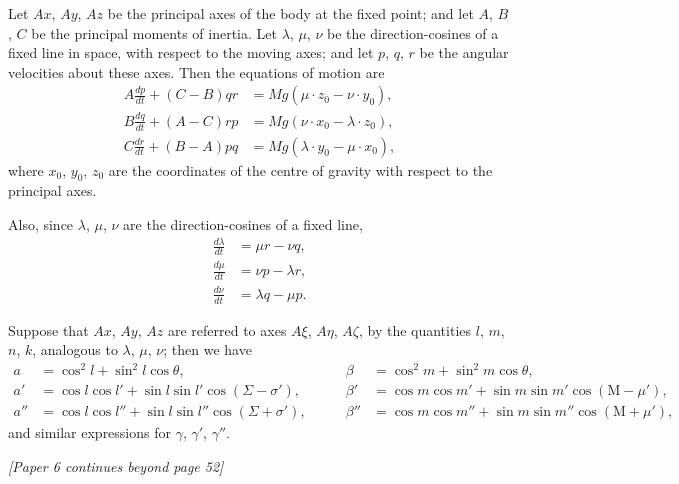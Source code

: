 \documentclass[11pt,a4paper]{book}
\begin{document}
Let $Ax$, $Ay$, $Az$ be the principal axes of the body at the fixed point; and let $A$, $B$, $C$ be the principal moments of inertia. Let $\lambda$, $\mu$, $\nu$ be the direction-cosines of a fixed line in space, with respect to the moving axes; and let $p$, $q$, $r$ be the angular velocities about these axes. Then the equations of motion are
\begin{align}
A \frac{dp}{dt} + (C - B)qr &= M g (\mu \cdot z_0 - \nu \cdot y_0), \\
B \frac{dq}{dt} + (A - C)rp &= M g (\nu \cdot x_0 - \lambda \cdot z_0), \\
C \frac{dr}{dt} + (B - A)pq &= M g (\lambda \cdot y_0 - \mu \cdot x_0),
\end{align}
where $x_0$, $y_0$, $z_0$ are the coordinates of the centre of gravity with respect to the principal axes.

Also, since $\lambda$, $\mu$, $\nu$ are the direction-cosines of a fixed line,
\begin{align}
\frac{d\lambda}{dt} &= \mu r - \nu q, \\
\frac{d\mu}{dt} &= \nu p - \lambda r, \\
\frac{d\nu}{dt} &= \lambda q - \mu p.
\end{align}

Suppose that $Ax$, $Ay$, $Az$ are referred to axes $A\xi$, $A\eta$, $A\zeta$, by the quantities $l$, $m$, $n$, $k$, analogous to $\lambda$, $\mu$, $\nu$; then we have
\[
\begin{aligned}
a &= \cos^2 l + \sin^2 l \cos \theta, \\
a' &= \cos l \cos l' + \sin l \sin l' \cos(\Sigma - \sigma'), \\
a'' &= \cos l \cos l'' + \sin l \sin l'' \cos(\Sigma + \sigma'),
\end{aligned}
\qquad
\begin{aligned}
\beta &= \cos^2 m + \sin^2 m \cos \theta, \\
\beta' &= \cos m \cos m' + \sin m \sin m' \cos(\mathrm{M} - \mu'), \\
\beta'' &= \cos m \cos m'' + \sin m \sin m'' \cos(\mathrm{M} + \mu'),
\end{aligned}
\]
and similar expressions for $\gamma$, $\gamma'$, $\gamma''$.

\vfill
\begin{center}
\textit{[Paper 6 continues beyond page 52]}
\end{center}

\cleardoublepage
\clearpage
\end{document}
